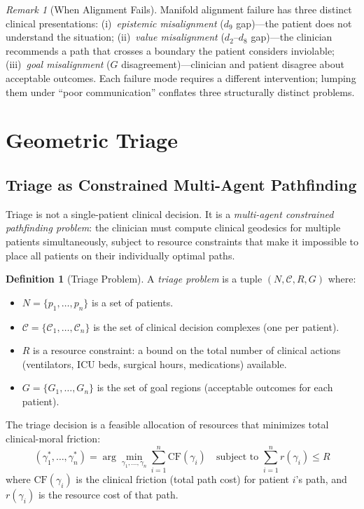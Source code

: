 \documentclass[12pt]{article}
\theoremstyle{definition}
\newtheorem{definition}[theorem]{Definition}
\theoremstyle{remark}
\newtheorem{remark}[theorem]{Remark}
\newcommand{\C}{\mathcal{C}}               %
\newcommand{\CF}{\mathrm{CF}}              %
\begin{document}
\begin{remark}[When Alignment Fails]
Manifold alignment failure has three distinct clinical presentations: (i)~\emph{epistemic misalignment} ($d_9$ gap)---the patient does not understand the situation; (ii)~\emph{value misalignment} ($d_2$--$d_8$ gap)---the clinician recommends a path that crosses a boundary the patient considers inviolable; (iii)~\emph{goal misalignment} ($G$ disagreement)---clinician and patient disagree about acceptable outcomes.  Each failure mode requires a different intervention; lumping them under ``poor communication'' conflates three structurally distinct problems.
\end{remark}


\section{Geometric Triage}
\label{sec:triage}

\subsection{Triage as Constrained Multi-Agent Pathfinding}

Triage is not a single-patient clinical decision.  It is a \emph{multi-agent constrained pathfinding problem}: the clinician must compute clinical geodesics for multiple patients simultaneously, subject to resource constraints that make it impossible to place all patients on their individually optimal paths.

\begin{definition}[Triage Problem]
\label{def:triage}
A \emph{triage problem} is a tuple $(N, \C, R, G)$ where:
\begin{itemize}
    \item $N = \{p_1, \ldots, p_n\}$ is a set of patients.
    \item $\C = \{\C_1, \ldots, \C_n\}$ is the set of clinical decision complexes (one per patient).
    \item $R$ is a resource constraint: a bound on the total number of clinical actions (ventilators, ICU beds, surgical hours, medications) available.
    \item $G = \{G_1, \ldots, G_n\}$ is the set of goal regions (acceptable outcomes for each patient).
\end{itemize}
The triage decision is a feasible allocation of resources that minimizes total clinical-moral friction:
\begin{equation}
(\gamma_1^*, \ldots, \gamma_n^*) = \arg\min_{\gamma_1, \ldots, \gamma_n} \sum_{i=1}^n \CF(\gamma_i) \quad \text{subject to } \sum_{i=1}^n r(\gamma_i) \leq R
\label{eq:triage}
\end{equation}
where $\CF(\gamma_i)$ is the clinical friction (total path cost) for patient $i$'s path, and $r(\gamma_i)$ is the resource cost of that path.
\end{definition}
\end{document}
